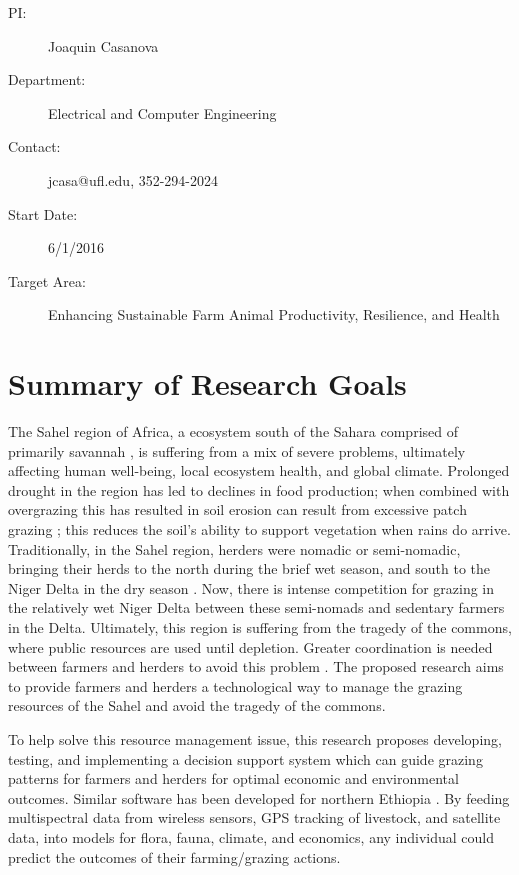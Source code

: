 \documentclass[11pt,letterpaper]{article}
\newcommand{\required}[1]{\section*{\hfil #1\hfil}}                    %
\begin{document}
\begin{description}
\item [PI:] Joaquin Casanova
\item [Department:] Electrical and Computer Engineering
\item [Contact:] jcasa@ufl.edu, 352-294-2024
\item [Start Date:] 6/1/2016
\item [Target Area:] Enhancing Sustainable Farm Animal Productivity, Resilience, and Health
\end{description}
\required{Summary of Research Goals}

The Sahel region of Africa, a ecosystem south of the Sahara comprised of primarily savannah \cite{wwf}, is suffering from a mix of severe problems, ultimately affecting human well-being, local ecosystem health, and global climate. Prolonged drought in the region has led to declines in food production; when combined with overgrazing this has resulted in soil erosion can result from excessive patch grazing \cite{coughenour1991spatial}; this reduces the soil's ability to support vegetation when rains do arrive. Traditionally, in the Sahel region, herders were nomadic or semi-nomadic, bringing their herds to the north during the brief wet season, and south to the Niger Delta in the dry season \cite{coughenour1991spatial}. Now, there is intense competition for grazing in the relatively wet Niger Delta between these semi-nomads and sedentary farmers in the Delta. Ultimately, this region is suffering from the tragedy of the commons, where public resources are used until depletion. Greater coordination is needed between farmers and herders to avoid this problem \cite{breman1983rangeland}. The proposed research aims to provide farmers and herders a technological way to manage the grazing resources of the Sahel and avoid the tragedy of the commons.

To help solve this resource management issue, this research proposes developing, testing, and implementing a decision support system which can guide grazing patterns for farmers and herders for optimal economic and environmental outcomes. Similar software has been developed for northern Ethiopia \cite{dragan2003application}. By feeding multispectral data from  wireless sensors, GPS tracking of livestock, and satellite data, into models for flora, fauna, climate, and economics, any individual could predict the outcomes of their farming/grazing actions. 
\end{document}
